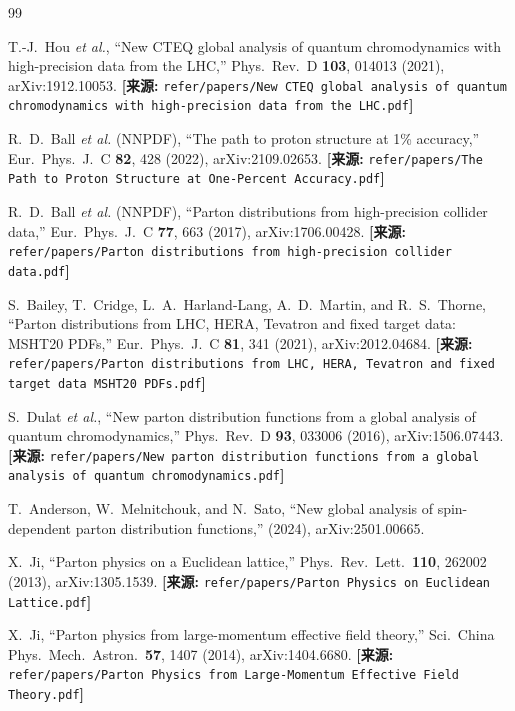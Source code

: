 \documentclass[12pt,a4paper]{ctexart}
\theoremstyle{definition}
\begin{document}
\begin{thebibliography}{99}

T.-J.~Hou \textit{et al.},
``New CTEQ global analysis of quantum chromodynamics with high-precision data from the LHC,''
Phys.\ Rev.\ D \textbf{103}, 014013 (2021), arXiv:1912.10053.
\quad\textbf{[来源:} \texttt{refer/papers/New CTEQ global analysis of quantum chromodynamics with high-precision data from the LHC.pdf}\textbf{]}

R.~D.~Ball \textit{et al.} (NNPDF),
``The path to proton structure at 1\% accuracy,''
Eur.\ Phys.\ J.\ C \textbf{82}, 428 (2022), arXiv:2109.02653.
\quad\textbf{[来源:} \texttt{refer/papers/The Path to Proton Structure at One-Percent Accuracy.pdf}\textbf{]}

R.~D.~Ball \textit{et al.} (NNPDF),
``Parton distributions from high-precision collider data,''
Eur.\ Phys.\ J.\ C \textbf{77}, 663 (2017), arXiv:1706.00428.
\quad\textbf{[来源:} \texttt{refer/papers/Parton distributions from high-precision collider data.pdf}\textbf{]}

S.~Bailey, T.~Cridge, L.~A.~Harland-Lang, A.~D.~Martin, and R.~S.~Thorne,
``Parton distributions from LHC, HERA, Tevatron and fixed target data: MSHT20 PDFs,''
Eur.\ Phys.\ J.\ C \textbf{81}, 341 (2021), arXiv:2012.04684.
\quad\textbf{[来源:} \texttt{refer/papers/Parton distributions from LHC, HERA, Tevatron and fixed target data MSHT20 PDFs.pdf}\textbf{]}

S.~Dulat \textit{et al.},
``New parton distribution functions from a global analysis of quantum chromodynamics,''
Phys.\ Rev.\ D \textbf{93}, 033006 (2016), arXiv:1506.07443.
\quad\textbf{[来源:} \texttt{refer/papers/New parton distribution functions from a global analysis of quantum chromodynamics.pdf}\textbf{]}

T.~Anderson, W.~Melnitchouk, and N.~Sato,
``New global analysis of spin-dependent parton distribution functions,''
(2024), arXiv:2501.00665.

X.~Ji,
``Parton physics on a Euclidean lattice,''
Phys.\ Rev.\ Lett.\ \textbf{110}, 262002 (2013), arXiv:1305.1539.
\quad\textbf{[来源:} \texttt{refer/papers/Parton Physics on Euclidean Lattice.pdf}\textbf{]}

X.~Ji,
``Parton physics from large-momentum effective field theory,''
Sci.\ China Phys.\ Mech.\ Astron.\ \textbf{57}, 1407 (2014), arXiv:1404.6680.
\quad\textbf{[来源:} \texttt{refer/papers/Parton Physics from Large-Momentum Effective Field Theory.pdf}\textbf{]}


\end{thebibliography}
\end{document}
